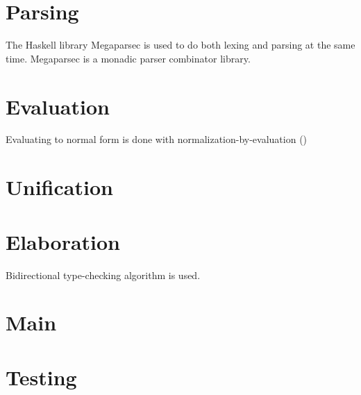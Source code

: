 \section{Parsing}

The Haskell library Megaparsec is used to do both lexing and parsing at the same
time. Megaparsec is a monadic parser combinator library.

\section{Evaluation}

Evaluating to normal form is done with normalization-by-evaluation ()

\section{Unification}

\section{Elaboration}

Bidirectional type-checking algorithm is used.

\section{Main}

\section{Testing}
